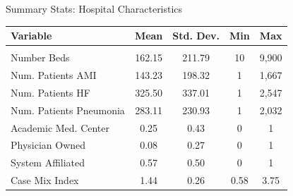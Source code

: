 \documentclass[notes,11pt, aspectratio=169]{beamer}
\begin{document}
\begin{frame}[noframenumbering]{Summary Stats: Hospital Characteristics}
    \begin{table}[ht!]
\centering
\begin{tabular}[t]{lcccc}
\toprule
Variable & Mean & Std. Dev. & Min & Max\\
\midrule
\addlinespace[0.3em]
\multicolumn{5}{l}{\textbf{Hospital Characteristics}}\\
\hspace{1em}Number Beds & 162.15 & 211.79 & 10 & 9,900\\
\hspace{1em}Num. Patients AMI & 143.23 & 198.32 & 1 & 1,667\\
\hspace{1em}Num. Patients HF & 325.50 & 337.01 & 1 & 2,547\\
\hspace{1em}Num. Patients Pneumonia & 283.11 & 230.93 & 1 & 2,032\\
\hspace{1em}Academic Med. Center & 0.25 & 0.43 & 0 & 1\\
\hspace{1em}Physician Owned & 0.08 & 0.27 & 0 & 1\\
\hspace{1em}System Affiliated & 0.57 & 0.50 & 0 & 1\\
\hspace{1em}Case Mix Index & 1.44 & 0.26 & 0.58 & 3.75\\
\bottomrule
\end{tabular}
\end{table}
\end{frame}
\end{document}
